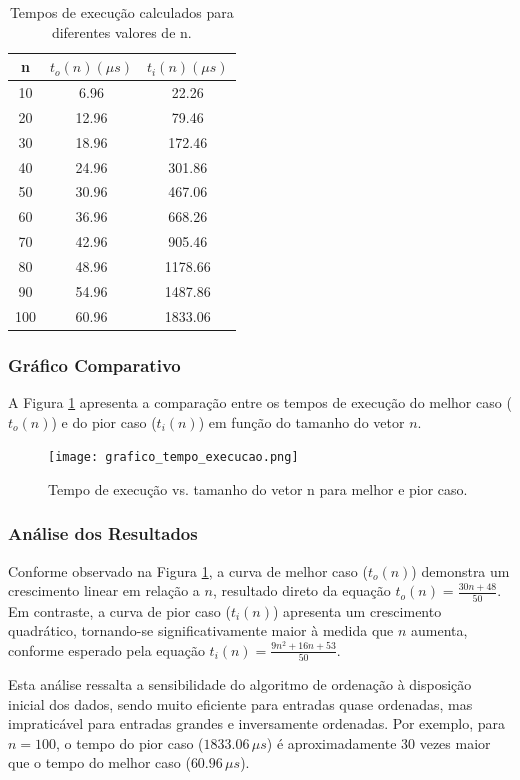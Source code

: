 \documentclass[12pt,a4paper]{article}
\begin{document}
\begin{table}[H]
\centering
\begin{tabular}{|c|c|c|}
\hline
\textbf{n} & \textbf{$t_o(n) (\mu s)$} & \textbf{$t_i(n) (\mu s)$} \\
\hline
10 & 6.96 & 22.26 \\
20 & 12.96 & 79.46 \\
30 & 18.96 & 172.46 \\
40 & 24.96 & 301.86 \\
50 & 30.96 & 467.06 \\
60 & 36.96 & 668.26 \\
70 & 42.96 & 905.46 \\
80 & 48.96 & 1178.66 \\
90 & 54.96 & 1487.86 \\
100 & 60.96 & 1833.06 \\
\hline
\end{tabular}
\caption{Tempos de execução calculados para diferentes valores de n.}
\end{table}

\subsubsection*{Gráfico Comparativo}

A Figura \ref{fig:tempo_execucao} apresenta a comparação entre os tempos de execução do melhor caso ($t_o(n)$) e do pior caso ($t_i(n)$) em função do tamanho do vetor $n$.

\begin{figure}[H]
\centering
\texttt{[image: grafico\_tempo\_execucao.png]}
\caption{Tempo de execução vs. tamanho do vetor n para melhor e pior caso.}
\label{fig:tempo_execucao}
\end{figure}

\subsubsection*{Análise dos Resultados}

Conforme observado na Figura \ref{fig:tempo_execucao}, a curva de melhor caso ($t_o(n)$) demonstra um crescimento linear em relação a $n$, resultado direto da equação $t_o(n) = \frac{30n + 48}{50}$. Em contraste, a curva de pior caso ($t_i(n)$) apresenta um crescimento quadrático, tornando-se significativamente maior à medida que $n$ aumenta, conforme esperado pela equação $t_i(n) = \frac{9n^{2} + 16n + 53}{50}$. 

Esta análise ressalta a sensibilidade do algoritmo de ordenação à disposição inicial dos dados, sendo muito eficiente para entradas quase ordenadas, mas impraticável para entradas grandes e inversamente ordenadas. Por exemplo, para $n=100$, o tempo do pior caso ($1833.06\,\mu s$) é aproximadamente 30 vezes maior que o tempo do melhor caso ($60.96\,\mu s$).
\end{document}
